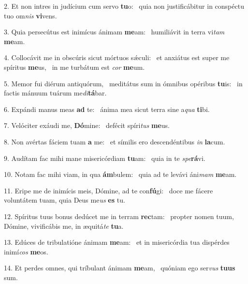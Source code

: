 2. Et non intres in judícium cum servo \textbf{tu}o: \ast\  quia non justificábitur in conspéctu tuo om\textit{nis} \textbf{vi}vens.\

3. Quia persecútus est inimícus ánimam \textbf{me}am: \ast\  humiliávit in terra vi\textit{tam} \textbf{me}am.\

4. Collocávit me in obscúris sicut mórtuos sǽculi: \dag\  et anxiátus est super me spíritus \textbf{me}us, \ast\  in me turbátum est \textit{cor} \textbf{me}um.\

5. Memor fui diérum antiquórum, \dag\  meditátus sum in ómnibus opéribus \textbf{tu}is: \ast\  in factis mánuum tuárum me\textit{di}\textbf{tá}bar.\

6. Expándi manus meas \textbf{ad} te: \ast\  ánima mea sicut terra sine a\textit{qua} \textbf{ti}bi.\

7. Velóciter exáudi me, \textbf{Dó}mine: \ast\  defécit spíri\textit{tus} \textbf{me}us.\

8. Non avértas fáciem tuam \textbf{a} me: \ast\  et símilis ero descendéntibus \textit{in} \textbf{la}cum.\

9. Audítam fac mihi mane misericórdiam \textbf{tu}am: \ast\  quia in te \textit{spe}\textbf{rá}vi.\

10. Notam fac mihi viam, in qua \textbf{ám}bulem: \ast\  quia ad te levávi áni\textit{mam} \textbf{me}am.\

11. Eripe me de inimícis meis, Dómine, ad te con\textbf{fú}gi: \ast\  doce me fácere voluntátem tuam, quia Deus me\textit{us} \textbf{es} tu.\

12. Spíritus tuus bonus dedúcet me in terram \textbf{rec}tam: \ast\  propter nomen tuum, Dómine, vivificábis me, in æquitá\textit{te} \textbf{tu}a.\

13. Edúces de tribulatióne ánimam \textbf{me}am: \ast\  et in misericórdia tua dispérdes inimí\textit{cos} \textbf{me}os.\

14. Et perdes omnes, qui tríbulant ánimam \textbf{me}am, \ast\  quóniam ego ser\textit{vus} \textbf{tu}\textbf{us} sum.\

